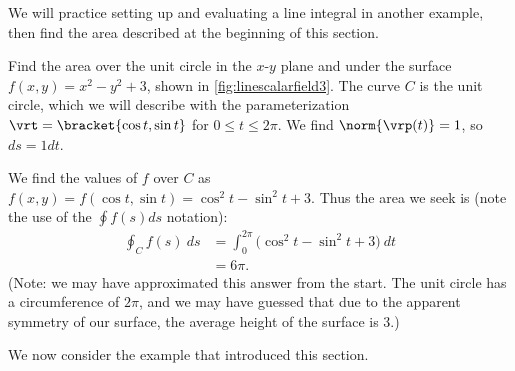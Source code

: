 We will practice setting up and evaluating a line integral in another example, then find the area described at the beginning of this section.


\begin{example}\label{ex_linescalarfield3}
Find the area over the unit circle in the $x$-$y$ plane and under the surface $f(x,y) = x^2-y^2+3$, shown in \autoref{fig:linescalarfield3}.
\solution
The curve $C$ is the unit circle, which we will describe with the parameterization $\vrt =\bracket{\cos t,\sin t}$ for $0\leq t\leq 2\pi$. We find $\norm{\vrp(t)} = 1$, so $ds = 1 dt$.  

We find the values of $f$ over $C$ as $f(x,y) = f(\cos t, \sin t) = \cos^2t-\sin^2t+3$. Thus the area we seek is (note the use of the $\oint f(s) ds$ notation):
\begin{align*}
	\oint_C f(s)\ ds
	&= \int_0^{2\pi}\bigl(\cos^2t-\sin^2t+3\bigr)\ dt \\
	&= 6\pi.
\end{align*}
(Note: we may have approximated this answer from the start. The unit circle has a circumference of $2\pi$, and we may have guessed that due to the apparent symmetry of our surface, the average height of the surface is 3.)
\end{example}

We now consider the example that introduced this section.

